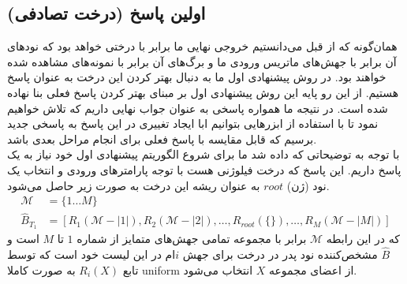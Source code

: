 \subsection{اولین پاسخ (درخت تصادفی)}
همان‌گونه که از قبل می‌دانستیم خروجی نهایی ما برابر با درختی خواهد بود که نودهای آن برابر با جهش‌های ماتریس ورودی ما و برگ‌های آن برابر با نمونه‌های مشاهده شده خواهند بود. در روش پیشنهادی اول ما به دنبال بهتر کردن این درخت به عنوان پاسخ هستیم. از این رو پایه این روش پیشنهادی اول بر مبنای بهتر کردن پاسخ فعلی بنا نهاده شده است. در نتیجه ما همواره پاسخی به عنوان جواب نهایی داریم که تلاش خواهیم نمود تا با استفاده از ابزرهایی بتوانیم ابا ایجاد تغییری در این پاسخ به پاسخی جدید برسیم که قابل مقایسه با پاسخ فعلی برای انجام مراحل بعدی باشد.
\\
 با توجه به توضیحاتی که داده شد ما برای شروع الگوریتم پیشنهادی اول خود نیاز به یک پاسخ داریم. این پاسخ که درخت فیلوژنی هست با توجه پارامترهای ورودی و انتخاب یک نود (ژن) $root$ به عنوان ریشه این درخت به صورت زیر حاصل می‌شود.
 \begin{equation}
 	\begin{aligned}
 		\mathcal{M} &= \{1\dots M\} \\
 		\hat{B}_{T_1} &= [R_1(\mathcal{M}-|1|), R_2(\mathcal{M}-|2|), \dots, R_{root}(\{\}), \dots, R_M(\mathcal{M}-|M|)] 
 	\end{aligned}
 \end{equation}
که در این رابطه $\mathcal{M}$ برابر با مجموعه تمامی جهش‌های متمایز از شماره $1$ تا  $M$ است و $\hat{B}$ مشخص‌کننده نود پدر در درخت برای جهش $i$ام در این لیست خود است که توسط تابع $R_i(X)$ به صورت کاملا \gls{uniform} از اعضای مجموعه  $X$ انتخاب می‌شود.
\\

